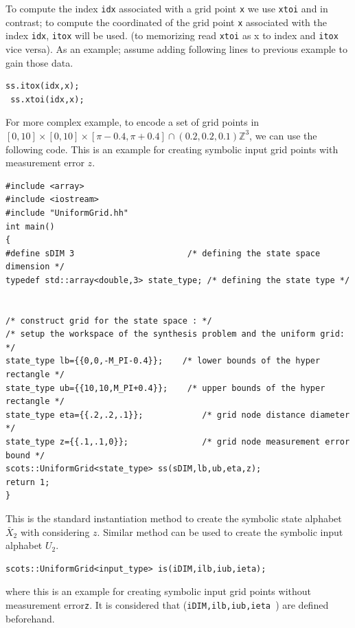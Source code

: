 \documentclass[a4paper]{amsart}
\newcommand{\intcc}[1]{\ensuremath{{\left[#1\right]}}}
\newcommand{\Z}{\mathbb{Z}}
\begin{document}
To compute the index {\tt\small idx} associated with a grid point {\tt\small x} we use 
{\tt\small xtoi} and in contrast; to compute the coordinated of the grid point {\tt\small x} associated with the index {\tt\small idx}, {\tt\small itox} will be used. (to memorizing read {\tt\small xtoi} as x to index  and {\tt\small itox}  vice versa).
As an example; assume adding following lines to previous example to gain those data.
\begin{lstlisting}[basicstyle=\footnotesize\ttfamily]
 ss.itox(idx,x);
 ss.xtoi(idx,x);
\end{lstlisting} 
 
 
 
 
 

For more complex example, to encode a set of grid points in $\intcc{0,10}\times \intcc{0,10}\times \intcc{\pi-0.4,\pi+0.4} \cap
    (0.2,0.2,0.1)\Z^3$, we can use the following code. This is an example for creating symbolic input grid points with measurement error $z$.
    
    
\begin{lstlisting}[basicstyle=\footnotesize\ttfamily]
#include <array>
#include <iostream>
#include "UniformGrid.hh"
int main() 
{
#define sDIM 3 						 /* defining the state space  dimension */
typedef std::array<double,3> state_type; /* defining the state type */


/* construct grid for the state space : */
/* setup the workspace of the synthesis problem and the uniform grid:  */
state_type lb={{0,0,-M_PI-0.4}};  	/* lower bounds of the hyper rectangle */ 
state_type ub={{10,10,M_PI+0.4}};    /* upper bounds of the hyper rectangle */
state_type eta={{.2,.2,.1}};   		    /* grid node distance diameter */
state_type z={{.1,.1,0}};   		    /* grid node measurement error bound */
scots::UniformGrid<state_type> ss(sDIM,lb,ub,eta,z);              
return 1;
}
\end{lstlisting}
This is the standard instantiation method to create the symbolic state alphabet $\bar X_2$ with considering $z$. Similar method can be used to create the symbolic input alphabet $U_2$.
\begin{lstlisting}[basicstyle=\footnotesize\ttfamily]
scots::UniformGrid<input_type> is(iDIM,ilb,iub,ieta);
\end{lstlisting}
where this is an example for creating symbolic input grid points without measurement error{\tt\small z}. It is considered that ({\tt\small iDIM,ilb,iub,ieta }) are defined beforehand.
\end{document}
